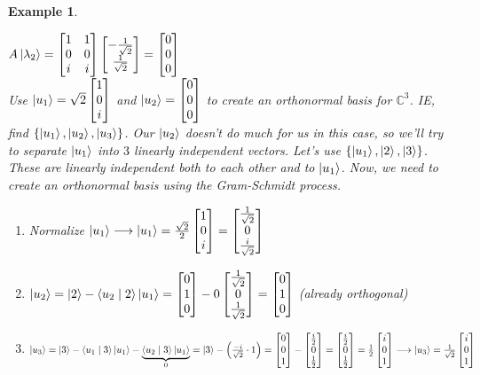 \documentclass[12pt]{article}
\theoremstyle{plain}
\theoremstyle{nonumberplain}
\theoremstyle{plain}
\newtheorem{example}[lemma]{Example}
\theoremstyle{nonumberplain}
\newcommand\1{{\bf 1}}
\newcommand{\bmat}[1]{\begin{bmatrix*} #1 \end{bmatrix*}} %
\newcommand{\C}{\mathbb{C}} %
\newcommand{\<}{\left\langle}
\renewcommand{\>}{\right\rangle}
\newcommand{\inp}[2]{\left\langle#1\mid #2\right\rangle} %
\begin{document}
\begin{example}
\begin{enumerate}
$A\ket{\lambda_2}=\bmat{1 & 1 \\ 0 & 0 \\ i & i}\bmat{-\frac{1}{\sqrt{2}} \\ \frac{1}{\sqrt{2}}}=\bmat{0 \\ 0 \\ 0}$ \\
Use $\ket{u_1}=\sqrt{2}\bmat{1 \\ 0 \\ i}$ and $\ket{u_2}=\bmat{0 \\ 0 \\ 0}$ to create an orthonormal basis for $\C^3$. IE, find $\lbrace\ket{u_1},\ket{u_2},\ket{u_3}\rbrace$. Our $\ket{u_2}$ doesn't do much for us in this case, so we'll try to separate $\ket{u_1}$ into $3$ linearly independent vectors. Let's use $\lbrace\ket{u_1},\ket{2},\ket{3}\rbrace$. These are linearly independent both to each other and to $\ket{u_1}$. Now, we need to create an orthonormal basis using the Gram-Schmidt process. \\
\begin{enumerate}
\item Normalize $\ket{u_1}\longrightarrow\ket{u_1}=\frac{\sqrt{2}}{2}\bmat{1 \\ 0 \\ i}=\bmat{\frac{1}{\sqrt{2}} \\ 0 \\ \frac{i}{\sqrt{2}}}$
\item $\ket{u_2}=\ket{2}-\inp{u_2}{2}\ket{u_1}=\bmat{0 \\ 1 \\ 0}-0\bmat{\frac{1}{\sqrt{2}} \\ 0 \\ \frac{1}{\sqrt{2}}}=\bmat{0 \\ 1 \\ 0}$ (already orthogonal)
\item $\ket{u_3}=\ket{3}-\inp{u_1}{3}\ket{u_1}-\underbrace{\textstyle \inp{u_2}{3}\ket{u_1}}_{\mathclap{0}}=\ket{3}-\left(\frac{-i}{\sqrt{2}}\cdot 1\right)=\bmat{0 \\ 0 \\ 1}-\bmat{\frac{i}{2} \\ 0 \\ \frac{1}{2}}=\bmat{\frac{i}{2} \\ 0 \\ \frac{1}{2}}=\frac{1}{2}\bmat{i \\ 0 \\ 1}\longrightarrow\ket{u_3}=\frac{1}{\sqrt{2}}\bmat{i \\ 0 \\ 1}$ \\

\end{enumerate}
\end{enumerate}
\end{example}
\end{document}
